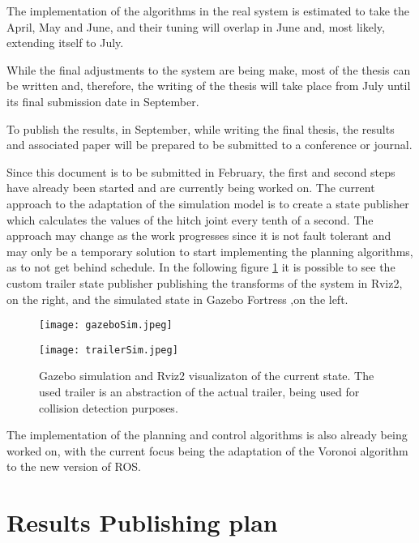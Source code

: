 The implementation of the algorithms in the real system is estimated to take the April, 
May and June, and their tuning will overlap in June and, most likely, extending itself to July. 

While the final adjustments to the system are being make, most of the thesis can be written and, therefore, 
the writing of the thesis will take place from July until its final submission date in September. 

To publish the results, in September, while writing the final thesis, the results and associated paper 
will be prepared to be submitted to a conference or journal. 


Since this document is to be submitted in February, the first and second steps have already been started 
and are currently being worked on. The current approach to the adaptation of the simulation model is to create a 
state publisher which calculates the values of the hitch joint every tenth of a second. The approach may change as the work progresses since it is not fault tolerant and may only be 
a temporary solution to start implementing the planning algorithms, as to not get behind schedule.
In the following figure \ref{fig:publisher} it is possible to see the custom trailer state publisher 
publishing the transforms of the system in Rviz2, on the right, and the simulated state in Gazebo Fortress ,on the left.

\begin{figure}[htbp]
    \centering
    \begin{minipage}[b]{0.4\textwidth}
        \centering
        \texttt{[image: gazeboSim.jpeg]}
    \end{minipage}
    \hspace{0.75cm}
    \begin{minipage}[b]{0.4\textwidth}
        \centering
        \texttt{[image: trailerSim.jpeg]} 
    \end{minipage}
    \caption{Gazebo simulation and Rviz2 visualizaton of the current state. The used trailer 
    is an abstraction of the actual trailer, being used for collision detection purposes.}
    \label{fig:publisher}
\end{figure}

The implementation of the planning and control algorithms is also already being worked on, with the current focus 
being the adaptation of the Voronoi algorithm to the new version of ROS.
\section{Results Publishing plan}
\label{sec:resultsplan}
